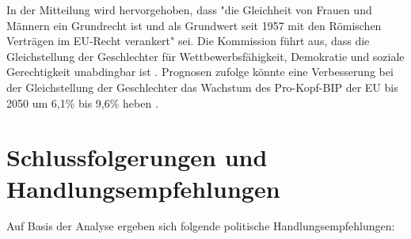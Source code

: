 \documentclass[12pt,a4paper]{article}
\begin{document}
	In der Mitteilung wird hervorgehoben, dass "die Gleichheit von Frauen und Männern ein Grundrecht ist und als Grundwert seit 1957 mit den Römischen Verträgen im EU-Recht verankert" sei. Die Kommission führt aus, dass die Gleichstellung der Geschlechter für Wettbewerbsfähigkeit, Demokratie und soziale Gerechtigkeit unabdingbar ist \cite{eu_fahrplan_bremen}. Prognosen zufolge könnte eine Verbesserung bei der Gleichstellung der Geschlechter das Wachstum des Pro-Kopf-BIP der EU bis 2050 um 6,1\% bis 9,6\% heben \cite{eu_fahrplan_bremen}.
	
	\section{Schlussfolgerungen und Handlungsempfehlungen}
	
	Auf Basis der Analyse ergeben sich folgende politische Handlungsempfehlungen:
	
\end{document}
